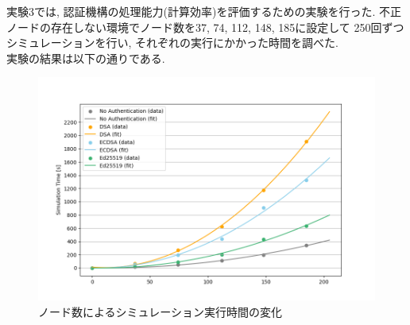 \indent 実験3では, 認証機構の処理能力(計算効率)を評価するための実験を行った. 
不正ノードの存在しない環境でノード数を37, 74, 112, 148, 185に設定して
250回ずつシミュレーションを行い, それぞれの実行にかかった時間を調べた.\\
\indent 実験の結果は以下の通りである. \\

\begin{figure}
  \centering
  \includegraphics[width=1\textwidth]{figures/exp3_simtime.png}
  \caption{ノード数によるシミュレーション実行時間の変化}
  \label{fig:exp3_simtime}
\end{figure}

